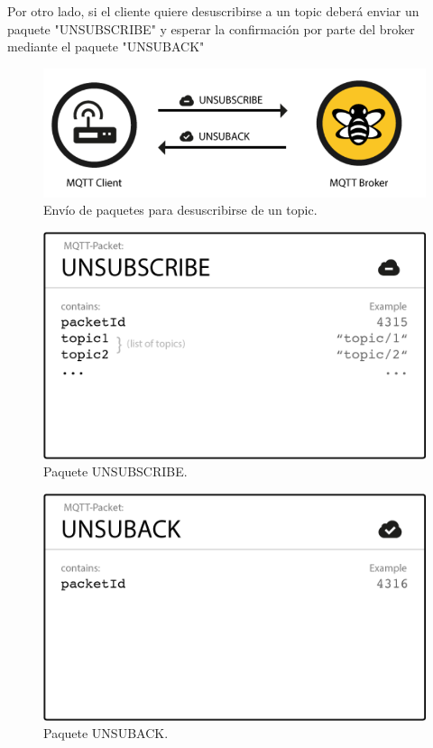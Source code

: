 \documentclass[12pt, twoside]{book}
\begin{document}
Por otro lado, si el cliente quiere desuscribirse a un topic deberá enviar un paquete "UNSUBSCRIBE" y esperar la confirmación por parte del broker mediante el paquete "UNSUBACK"
\begin{figure}[H]
\centering
\includegraphics[scale=0.5]{images/flujo_desuscribir.png}
\caption{Envío de paquetes para desuscribirse de un topic.}\label{L406}
\end{figure}
\begin{figure}[H]
\centering
\includegraphics[scale=0.3]{images/unsubscribe_packet.png}
\caption{Paquete UNSUBSCRIBE.}\label{L407}
\end{figure}
\begin{figure}[H]
\centering
\includegraphics[scale=0.3]{images/unsuback_packet.png}
\caption{Paquete UNSUBACK.}\label{L408}
\end{figure}
\end{document}
